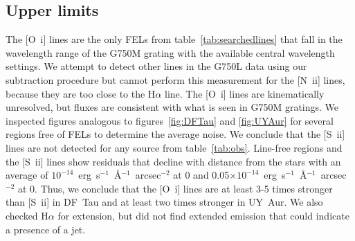 \documentclass[twocolumn,trackchanges]{aastex63}
\begin{document}
\subsection{Upper limits}
The [O~{\sc i}] lines are the only FELs from table~\ref{tab:searchedlines} that fall in the wavelength range of the G750M grating with the available central wavelength settings. We attempt to detect other lines in the G750L data using our subtraction procedure but cannot perform this measurement for the [N~{\sc ii}] lines, because they are too close to the H$\alpha$ line. The [O~{\sc i}] lines are kinematically unresolved, but fluxes are consistent with what is seen in G750M gratings. We inspected figures analogous to figures~\ref{fig:DFTau} and \ref{fig:UYAur} for several regions free of FELs to determine the average noise. We conclude that the [S~{\sc ii}] lines are not detected for any source from table~\ref{tab:obs}. Line-free regions and the [S~{\sc ii}] lines show residuals that decline with distance from the stars with an average of $10^{-14}$~erg~s$^{-1}$~\AA{}$^{-1}$~arcsec$^{-2}$ at 0 and 0.05$\times10^{-14}$~erg~s$^{-1}$~\AA{}$^{-1}$~arcsec$^{-2}$ at 0. Thus, we conclude that the [O~{\sc i}] lines are at least 3-5 times stronger than [S~{\sc ii}] in DF~Tau and at least two times stronger in UY~Aur. We also checked H$\alpha$ for extension, but did not find extended emission that could indicate a presence of a jet. 
\end{document}
